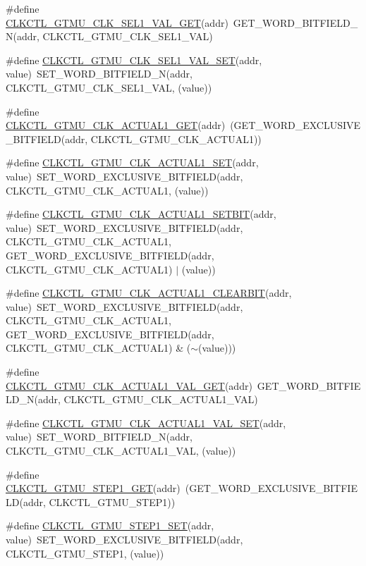 \begin{DoxyCompactItemize}
\item 
\#define \hyperlink{a00544_ae04dc0f9a3b91739e801d4eb69e41632}{CLKCTL\_\-GTMU\_\-CLK\_\-SEL1\_\-VAL\_\-GET}(addr)~GET\_\-WORD\_\-BITFIELD\_\-N(addr, CLKCTL\_\-GTMU\_\-CLK\_\-SEL1\_\-VAL)
\item 
\#define \hyperlink{a00544_a1024362b568507a4f7c2d9c8753e0f5e}{CLKCTL\_\-GTMU\_\-CLK\_\-SEL1\_\-VAL\_\-SET}(addr, value)~SET\_\-WORD\_\-BITFIELD\_\-N(addr, CLKCTL\_\-GTMU\_\-CLK\_\-SEL1\_\-VAL, (value))
\item 
\#define \hyperlink{a00544_aff4c406847858de3b9d34376c3587f8a}{CLKCTL\_\-GTMU\_\-CLK\_\-ACTUAL1\_\-GET}(addr)~(GET\_\-WORD\_\-EXCLUSIVE\_\-BITFIELD(addr, CLKCTL\_\-GTMU\_\-CLK\_\-ACTUAL1))
\item 
\#define \hyperlink{a00544_aba329f339015dc84ecbf2f65476bade7}{CLKCTL\_\-GTMU\_\-CLK\_\-ACTUAL1\_\-SET}(addr, value)~SET\_\-WORD\_\-EXCLUSIVE\_\-BITFIELD(addr, CLKCTL\_\-GTMU\_\-CLK\_\-ACTUAL1, (value))
\item 
\#define \hyperlink{a00544_a541b8df9a6680e3abbdf69d1cd411bad}{CLKCTL\_\-GTMU\_\-CLK\_\-ACTUAL1\_\-SETBIT}(addr, value)~SET\_\-WORD\_\-EXCLUSIVE\_\-BITFIELD(addr, CLKCTL\_\-GTMU\_\-CLK\_\-ACTUAL1, GET\_\-WORD\_\-EXCLUSIVE\_\-BITFIELD(addr, CLKCTL\_\-GTMU\_\-CLK\_\-ACTUAL1) $|$ (value))
\item 
\#define \hyperlink{a00544_ab084ed78efe17953be34560bb345278d}{CLKCTL\_\-GTMU\_\-CLK\_\-ACTUAL1\_\-CLEARBIT}(addr, value)~SET\_\-WORD\_\-EXCLUSIVE\_\-BITFIELD(addr, CLKCTL\_\-GTMU\_\-CLK\_\-ACTUAL1, GET\_\-WORD\_\-EXCLUSIVE\_\-BITFIELD(addr, CLKCTL\_\-GTMU\_\-CLK\_\-ACTUAL1) \& ($\sim$(value)))
\item 
\#define \hyperlink{a00544_a10d516f2a6cfa6eaa31f0aabe115290f}{CLKCTL\_\-GTMU\_\-CLK\_\-ACTUAL1\_\-VAL\_\-GET}(addr)~GET\_\-WORD\_\-BITFIELD\_\-N(addr, CLKCTL\_\-GTMU\_\-CLK\_\-ACTUAL1\_\-VAL)
\item 
\#define \hyperlink{a00544_a3a49106030466d3968129d8b5efc0935}{CLKCTL\_\-GTMU\_\-CLK\_\-ACTUAL1\_\-VAL\_\-SET}(addr, value)~SET\_\-WORD\_\-BITFIELD\_\-N(addr, CLKCTL\_\-GTMU\_\-CLK\_\-ACTUAL1\_\-VAL, (value))
\item 
\#define \hyperlink{a00544_a6b6a5bcd3478fb01fa15a1b7c584784e}{CLKCTL\_\-GTMU\_\-STEP1\_\-GET}(addr)~(GET\_\-WORD\_\-EXCLUSIVE\_\-BITFIELD(addr, CLKCTL\_\-GTMU\_\-STEP1))
\item 
\#define \hyperlink{a00544_a1edde4501c8fd13d52db5a22477a50d2}{CLKCTL\_\-GTMU\_\-STEP1\_\-SET}(addr, value)~SET\_\-WORD\_\-EXCLUSIVE\_\-BITFIELD(addr, CLKCTL\_\-GTMU\_\-STEP1, (value))
\item 

\end{DoxyCompactItemize}
